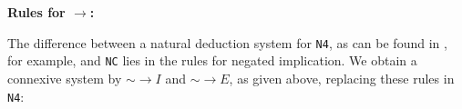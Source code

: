 \documentclass{article}%
\theoremstyle{break}
\begin{document}
\vspace{0.2cm}

\quad  
{}
\quad  \quad \quad
{}
\quad  \quad
{}
\vspace{0.2cm}

\textbf{Rules for $\rightarrow$:}

\vspace{0.2cm}

\quad 
{}
\quad \hspace{-0.35cm} 
\quad \hspace{-0.35cm}
\quad \hspace{-0.35cm} 

 The difference between a natural deduction system  for \texttt{N4}, as can be found in \cite[p. 97]{Prawitz1965}, for example, and \texttt{NC} lies in the rules for negated implication.
 We obtain a connexive system by ${\sim\rightarrow} I$ and ${\sim\rightarrow} E$, as given above, replacing these rules in \texttt{N4}:
 
 \quad 
{}
\quad \quad
{}
\quad \quad
{}
\end{document}
